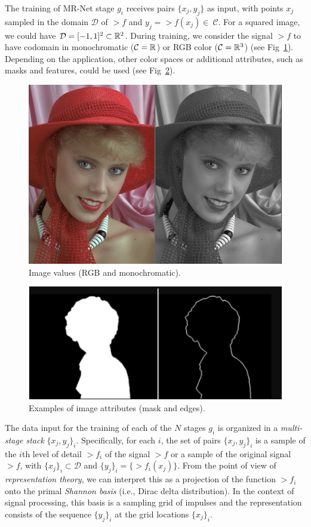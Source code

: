 The training of MR-Net stage $g_i$ receives pairs $\{x_j, y_j\}$ as input, with points $x_j$ sampled in the domain $\mathcal{D}$ of $\gt{f}$ and $y_j=\gt{f}(x_j)\in~\mathcal{C}$. For a squared image, we could have $\mathcal{D}=[-1, 1]^2 \subset \mathbb{R}^{2}$. During training, we consider the signal $\gt{f}$ to have codomain in monochromatic ($\mathcal{C}=\mathbb{R}$) or RGB color ($\mathcal{C}=\mathbb{R}^3$) (see Fig~\ref{f:values}). 
Depending on the application, other color spaces or additional attributes, such as masks and features, could be used (see Fig~\ref{f:attributes}). 
\begin{figure}[!h]
\centering
\includegraphics[width=0.8\linewidth]{img/ch4/attrib-d0-d1.png}
\caption{Image values (RGB and monochromatic).}
\label{f:values}
\end{figure}

\begin{figure}[!h]
\centering
\includegraphics[width=0.8\linewidth]{img/ch4/attrib-mask.png}
\caption{Examples of image attributes (mask and edges).}
\label{f:attributes}
\end{figure}


The data input for the training of each of the $N$ stages $g_i$ is organized in a \textit{multi-stage stack} $\{x_j, y_j\}_i$.
Specifically, for each $i$, the set of pairs $\{x_j, y_j\}_i$ is a sample of the $i$th level of detail $\gt{f}_i$ of the signal $\gt{f}$ or a sample of the original signal $\gt{f}$, with $\{x_j\}_i\subset \mathcal{D}$ and $\{y_j\}_i=\{\gt{f}_i(x_j)\}$. 
From the point of view of \textit{representation theory}, we can interpret this as a projection of the function $\gt{f}_i$ onto the primal \textit{Shannon basis} (i.e., Dirac delta distribution). In the context of signal processing, this basis is a sampling grid of impulses and the representation consists of the sequence $\{y_j\}_i$ at the grid locations $\{x_j\}_i$.

